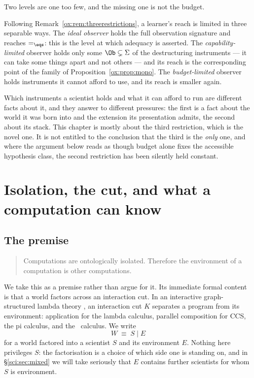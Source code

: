 Two levels are one too few, and the missing one is not the budget.

\begin{remark}
\label{sci:rem:three-limits}
Following Remark~\ref{ox:rem:threerestrictions}, a learner's reach is limited in three separable ways.
The \emph{ideal observer} holds the full observation signature and reaches $=_{\eqs}$: this is the
level at which adequacy is asserted. The \emph{capability-limited} observer holds only some
$\Ob \subsetneq \Sigma$ of the destructuring instruments --- it can take some things apart and not
others --- and its reach is the corresponding point of the family of
Proposition~\ref{ox:prop:mono}. The \emph{budget-limited} observer holds instruments it cannot afford
to use, and its reach is smaller again.

Which instruments a scientist holds and what it can afford to run are different facts about it, and
they answer to different pressures: the first is a fact about the world it was born into and the
extension its presentation admits, the second about its stack. This chapter is mostly about the third
restriction, which is the novel one. It is not entitled to the conclusion that the third is the
\emph{only} one, and where the argument below reads as though budget alone fixes the accessible
hypothesis class, the second restriction has been silently held constant.
\end{remark}

\section{Isolation, the cut, and what a computation can know}\label{sci:S2}
\label{sci:sec:cut}

\subsection{The premise}\label{sci:S2.1}

\begin{quote}
Computations are ontologically isolated. Therefore the environment of a computation is other
computations.
\end{quote}

We take this as a premise rather than argue for it. Its immediate formal content is that a world
factors across an interaction cut. In an interactive graph-structured lambda theory \cite{Omnibus},
an interaction cut $K$ separates a program from its environment: application for the lambda calculus,
parallel composition for CCS, the pi calculus, and the \rhoc\ calculus. We write
\[
W \;\equiv\; S \mid E
\]
for a world factored into a scientist $S$ and its environment $E$. Nothing here privileges $S$: the
factorisation is a choice of which side one is standing on, and in \S\ref{sci:sec:mixed} we will take
seriously that $E$ contains further scientists for whom $S$ is environment.

